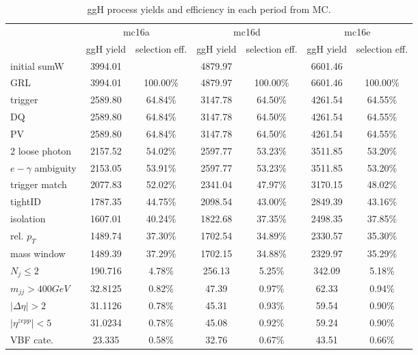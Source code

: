 \begin{table}[htbp]
\begin{center}
\begin{tabular}{l|cccccc}
\hline
                     & \multicolumn{2}{c}{mc16a}  & \multicolumn{2}{c}{mc16d}  & \multicolumn{2}{c}{mc16e}  \\
                     & ggH yield & selection eff. & ggH yield & selection eff. & ggH yield & selection eff. \\ \hline
initial sumW         & 3994.01   &                & 4879.97   &                & 6601.46   &                \\
GRL                  & 3994.01   & 100.00\%       & 4879.97   & 100.00\%       & 6601.46   & 100.00\%       \\
trigger              & 2589.80   & 64.84\%        & 3147.78   & 64.50\%        & 4261.54   & 64.55\%        \\
DQ                   & 2589.80   & 64.84\%        & 3147.78   & 64.50\%        & 4261.54   & 64.55\%        \\
PV                   & 2589.80   & 64.84\%        & 3147.78   & 64.50\%        & 4261.54   & 64.55\%        \\
2 loose photon       & 2157.52   & 54.02\%        & 2597.77   & 53.23\%        & 3511.85   & 53.20\%        \\
$e-\gamma$ ambiguity & 2153.05   & 53.91\%        & 2597.77   & 53.23\%        & 3511.85   & 53.20\%        \\
trigger match        & 2077.83   & 52.02\%        & 2341.04   & 47.97\%        & 3170.15   & 48.02\%        \\
tightID              & 1787.35   & 44.75\%        & 2098.54   & 43.00\%        & 2849.39   & 43.16\%        \\
isolation            & 1607.01   & 40.24\%        & 1822.68   & 37.35\%        & 2498.35   & 37.85\%        \\
rel. $p_{T}$         & 1489.74   & 37.30\%        & 1702.54   & 34.89\%        & 2330.57   & 35.30\%        \\
mass window          & 1489.39   & 37.29\%        & 1702.15   & 34.88\%        & 2329.97   & 35.29\%        \\
$N_{j}\le2$          & 190.716   & 4.78\%         & 256.13    & 5.25\%         & 342.09    & 5.18\%         \\
$m_{jj}>400GeV$      & 32.8125   & 0.82\%         & 47.39     & 0.97\%         & 62.33     & 0.94\%         \\
$|\Delta\eta|>2$     & 31.1126   & 0.78\%         & 45.31     & 0.93\%         & 59.54     & 0.90\%         \\
$|\eta^{zepp}|<5$    & 31.0234   & 0.78\%         & 45.08     & 0.92\%         & 59.24     & 0.90\%         \\
VBF cate.            & 23.335    & 0.58\%         & 32.76     & 0.67\%         & 43.51     & 0.66\%         \\
\hline
\end{tabular}
\caption{ggH process yields and efficiency in each period from MC.}
\label{tab:cutflowggH}
\end{center}
\end{table}

